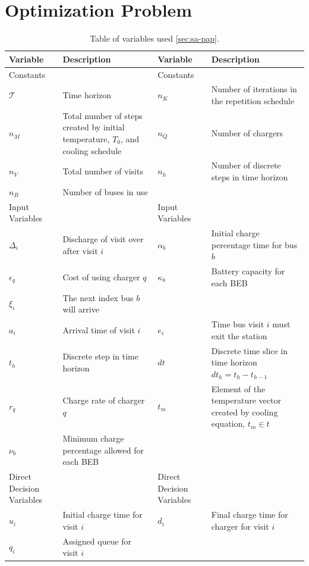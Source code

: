 \documentclass[ee,thesis]{usuthesis}
\newcommand{\T}{\mathcal{T}}                %
\newcommand{\Tau}{T}                        %
\begin{document}
\section{Optimization Problem}
\label{sec:optimization-problem}
\begin{table}[htbp]
\caption{\label{tab:variables}Table of variables used \ref{sec:sa-pap}.}
\centering
\begin{tabularx}{\textwidth}{L{0.3} L{1.2} L{0.3} L{1.2}}
\textbf{Variable} & \textbf{Description} & \textbf{Variable} & \textbf{Description}\\[0pt]
\hline
Constants &  & Constants & \\[0pt]
\(\T\) & Time horizon & \(n_K\) & Number of iterations in the repetition schedule\\[0pt]
\(n_M\) & Total number of steps created by initial temperature, \(\Tau_0\), and cooling schedule & \(n_Q\) & Number of chargers\\[0pt]
\(n_V\) & Total number of visits & \(n_h\) & Number of discrete steps in time horizon\\[0pt]
\(n_B\) & Number of buses in use &  & \\[0pt]
\hline
Input Variables &  & Input Variables & \\[0pt]
\(\Delta_i\) & Discharge of visit over after visit \(i\) & \(\alpha_b\) & Initial charge percentage time for bus \(b\)\\[0pt]
\(\epsilon_q\) & Cost of using charger \(q\) & \(\kappa_b\) & Battery capacity for each BEB\\[0pt]
\(\xi_i\) & The next index bus \(b\) will arrive &  & \\[0pt]
\(a_i\) & Arrival time of visit \(i\) & \(e_i\) & Time bus visit \(i\) must exit the station\\[0pt]
\(t_h\) & Discrete step in time horizon & \(dt\) & Discrete time slice in time horizon \(dt_h = t_h - t_{h-1}\)\\[0pt]
\(r_q\) & Charge rate of charger \(q\) & \(t_m\) & Element of the temperature vector created by cooling equation, \(t_m \in t\)\\[0pt]
\(\nu_b\) & Minimum charge percentage allowed for each BEB &  & \\[0pt]
\hline
Direct Decision Variables &  & Direct Decision Variables & \\[0pt]
\(u_i\) & Initial charge time for visit \(i\) & \(d_i\) & Final charge time for charger for visit \(i\)\\[0pt]
\(q_i\) & Assigned queue for visit \(i\) &  & \\[0pt]

\end{tabularx}
\end{table}
\end{document}
